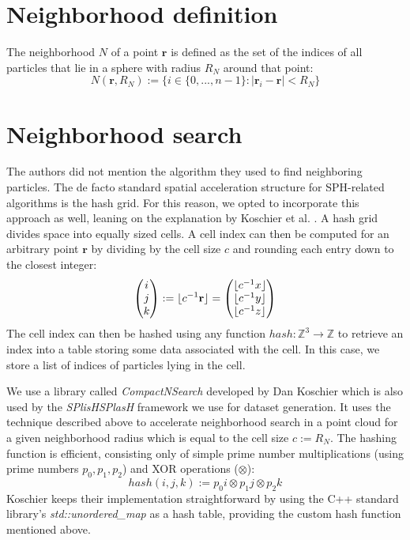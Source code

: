 \section{Neighborhood definition}

The neighborhood $N$ of a point $\textbf{r}$ is defined as the set of the indices of all particles that lie in a sphere with radius $R_N$ around that point:
$$N (\textbf{r}, R_N) := \{ i \in \{ 0,...,n-1 \} : | \textbf{r}_i - \textbf{r} | < R_N \}$$

\section{Neighborhood search}

The authors did not mention the algorithm they used to find neighboring particles. The de facto standard spatial acceleration structure for SPH-related algorithms is the hash grid. For this reason, we opted to incorporate this approach as well, leaning on the explanation by Koschier et al. \cite{Koschier:2019}. A hash grid divides space into equally sized cells. A cell index can then be computed for an arbitrary point $\textbf{r}$ by dividing by the cell size $c$ and rounding each entry down to the closest integer:
\[
\begin{pmatrix} i \\ j \\ k \end{pmatrix} :=
\lfloor c^{-1} \space \textbf{r} \rfloor =
\begin{pmatrix}
\lfloor c^{-1} \space x \rfloor \\
\lfloor c^{-1} \space y \rfloor \\
\lfloor c^{-1} \space z \rfloor \\
\end{pmatrix}
\]
The cell index can then be hashed using any function $hash: \mathbb{Z}^3 \rightarrow \mathbb{Z}$ to retrieve an index into a table storing some data associated with the cell. In this case, we store a list of indices of particles lying in the cell.

We use a library called \textit{CompactNSearch} developed by Dan Koschier \cite{CompactNSearch} which is also used by the \textit{SPlisHSPlasH} framework \cite{SplishSplash} we use for dataset generation. It uses the technique described above to accelerate neighborhood search in a point cloud for a given neighborhood radius which is equal to the cell size $c := R_N$. The hashing function is efficient, consisting only of simple prime number multiplications (using prime numbers $p_0,p_1,p_2$) and XOR operations ($\otimes$):
\[
hash(i,j,k) :=
p_0 i \otimes
p_1 j \otimes
p_2 k
\]
Koschier keeps their implementation straightforward by using the C++ standard library's \textit{std::unordered\_map} as a hash table, providing the custom hash function mentioned above.

